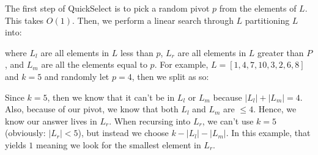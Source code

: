 \documentclass[14pt]{extarticle}
\begin{document}
    The first step of QuickSelect is to pick a random pivot $p$ from the 
    elements of $L$. This takes $O(1)$. Then, we perform a linear search
    through $L$ partitioning $L$ into:

    \begin{center}
    \end{center}
    
    where $L_l$ are all elements in $L$ less than $p$, $L_r$ are all elements
    in $L$ greater than $P$, and $L_m$ are all the elements equal to $p$.
    For example, $L = [1, 4, 7, 10, 3, 2, 6, 8]$ and $k = 5$ and randomly
    let $p = 4$, then we split as so:
 
    \begin{center}
    \end{center}
    Since $k = 5$, then we know that it can't be in $L_l$ or $L_m$ because
    $|L_l| + |L_m| = 4$. Also, because of our pivot, we know that both $L_l$
    and $L_m$ are $\leq 4$. Hence, we know our answer lives in $L_r$. When
    recursing into $L_r$, we can't use $k = 5$ (obviously: $|L_r| < 5$), but
    instead we choose $k - |L_l| - |L_m|$. In this example, that yields $1$
    meaning we look for the smallest element in $L_r$.\\
\end{document}
